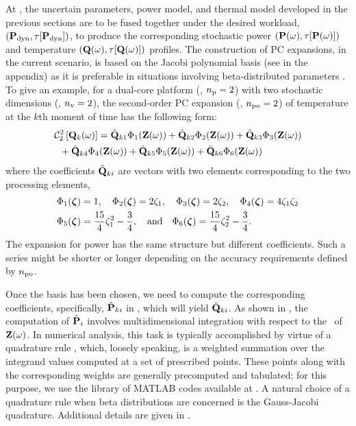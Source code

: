 At , the uncertain parameters, power model, and thermal model developed in the previous sections are to be fused together under the desired workload, $\profilePdyn$, to produce the corresponding stochastic power $\profileP{\o}$ and temperature $\profileT{\o}$ profiles.
The construction of PC expansions, in the current scenario, is based on the Jacobi polynomial basis (see  in the appendix) as it is preferable in situations involving beta-distributed parameters \cite{xiu2010}.
To give an example, for a dual-core platform (\ie, ${n_\text{p}} = 2$) with two stochastic dimensions (\ie, ${n_\text{v}} = 2$), the second-order PC expansion (\ie, ${n_\text{po}} = 2$) of temperature at the $k$th moment of time has the following form:
\begin{align}
  & \oPC{2}{2}{\vTO_k(\o)} = \pcc{\vTO}_{k1} \pcb_1(\vZ(\o)) + \pcc{\vTO}_{k2} \pcb_2(\vZ(\o)) + \pcc{\vTO}_{k3} \pcb_3(\vZ(\o)) \nonumber \\
  & {} \; \; + \pcc{\vTO}_{k4} \pcb_4(\vZ(\o)) + \pcc{\vTO}_{k5} \pcb_5(\vZ(\o)) + \pcc{\vTO}_{k6} \pcb_6(\vZ(\o)) \elabel{pc-example}
\end{align}
where the coefficients $\hat{\mathbf{Q}}_{ki}$ are vectors with two elements corresponding to the two processing elements,
\begin{align*}
  & \Phi_1(\boldsymbol{\zeta}) = 1, \hspace{1em} \Phi_2(\boldsymbol{\zeta}) = 2 \zeta_1, \hspace{1em} \Phi_3(\boldsymbol{\zeta}) = 2 \zeta_2, \hspace{1em} \Phi_4(\boldsymbol{\zeta}) = 4 \zeta_1 \zeta_2 \\
  & \Phi_5(\boldsymbol{\zeta}) = \frac{15}{4} \zeta_1^2 - \frac{3}{4}, \hspace{1em} \text{and} \hspace{1em} \Phi_6(\boldsymbol{\zeta}) = \frac{15}{4} \zeta_2^2 - \frac{3}{4}.
\end{align*}
The expansion for power has the same structure but different coefficients.
Such a series might be shorter or longer depending on the accuracy requirements defined by ${n_\text{po}}$.

Once the basis has been chosen, we need to compute the corresponding coefficients, specifically, $\hat{\mathbf{P}}_{ki}$ in , which will yield $\hat{\mathbf{Q}}_{ki}$.
As shown in , the computation of $\hat{\mathbf{P}}_i$ involves multidimensional integration with respect to the \pdf\ of $\mathbf{Z}(\omega)$.
In numerical analysis, this task is typically accomplished by virtue of a quadrature rule \cite{press2007}, which, loosely speaking, is a weighted summation over the integrand values computed at a set of prescribed points.
These points along with the corresponding weights are generally precomputed and tabulated; for this purpose, we use the library of MATLAB codes available at \cite{burkardt2013}.
A natural choice of a quadrature rule when beta distributions are concerned is the Gauss-Jacobi quadrature.
Additional details are given in .

